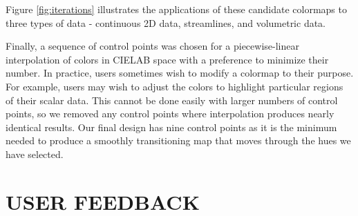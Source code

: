 \documentclass{IEEEcsmag}
\newcommand*{\colormap}[1]{\textsl{#1}\xspace}
\newcommand*{\coolwarm}{\colormap{Cool to Warm}}
\newcommand*{\fast}{\colormap{Fast}}
\begin{document}

Figure \ref{fig:iterations} illustrates the applications of these candidate colormaps to three types of data - continuous 2D data, streamlines, and volumetric data.




Finally, a sequence of control points was chosen for a piecewise-linear interpolation of colors in CIELAB space with a preference to minimize their number.
In practice, users sometimes wish to modify a colormap to their purpose.
For example, users may wish to adjust the colors to highlight particular regions of their scalar data.
This cannot be done easily with larger numbers of control points, so we removed any control points where interpolation produces nearly identical results.
Our final design has nine control points as it is the minimum needed to produce a smoothly transitioning map that moves through the hues we have selected.






\section{USER FEEDBACK}
\end{document}
